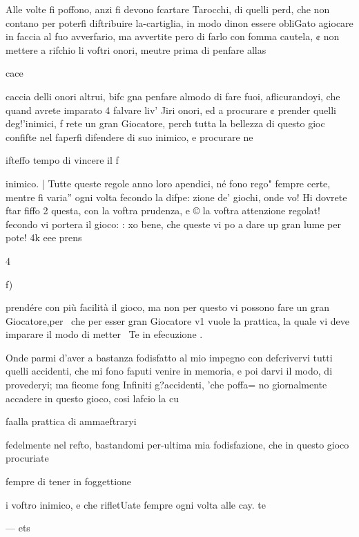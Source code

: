 \documentclass[11pt,a6paper]{article}
\begin{document}
Alle volte fi poffono, anzi fi
devono fcartare Tarocchi, di
quelli perd, che non contano
per poterfi diftribuire la-cartiglia, in modo dinon essere obliGato agiocare in faccia al fuo
avverfario, ma avvertite pero di
farlo con fomma cautela, ¢ non
mettere a rifchio li voftri onori,
meutre prima di penfare allas

cace
 

 

 

 

 

 

 

 

caccia delli onori altrui, bifc
gna penfare almodo di fare
fuoi, aflicurandoyi, che quand
avrete imparato 4 falvare liv’
Jiri onori, ed a procurare ¢
prender quelli deg!’inimici, f
rete un gran Giocatore, perch
tutta la bellezza di questo gioc
confifte nel faperfi difendere di
suo inimico, e procurare ne

ifteffo tempo di vincere il f

inimico. |
Tutte queste regole anno
loro apendici, né fono rego"
fempre certe, mentre fi varia”
ogni volta fecondo la difpe:
zione de’ giochi, onde vo! Hi
dovrete ftar fiffo 2 questa,
con la voftra prudenza, e ©
la voftra attenzione regolat!
fecondo vi portera il gioco: :
xo bene, che queste vi po a
dare up gran lume per pote! 4k
eee prens

4
 

 

f)

prendére con più facilità il gioco,
ma non per questo vi possono fare un gran Giocatore,per~
che per esser gran Giocatore v1
vuole la prattica, la quale vi deve imparare il modo di metter~
Te in efecuzione .

Onde parmi d’aver a bastanza
fodisfatto al mio impegno con
defcrivervi tutti quelli accidenti, che mi fono faputi venire in
memoria, e poi darvi il modo,
di provederyi; ma ficome fong
Infiniti g?accidenti, 'che poffa=
no giornalmente accadere in
questo gioco, cosi lafcio la cu

faalla prattica di ammaeftraryi

fedelmente nel refto, bastandomi per-ultima mia fodisfazione,
che in questo gioco procuriate

fempre di tener in foggettione

i voftro inimico, e che rifletUate fempre ogni volta alle cay.
te

— ets
 
\end{document}
